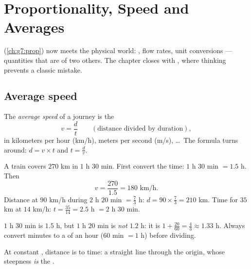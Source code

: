 \chapter{Proportionality, Speed and Averages}\label{ch:g8:speed}

 (\cref{ch:g7:prop}) now meets the physical world:
, flow rates, unit conversions --- quantities that are
\emph{} of two others. The chapter closes with , where  thinking prevents a classic mistake.

\section{Average speed}

\begin{definition}\label{def:g8:speed:def}
The \emph{average speed} of a journey is the 
\[
v = \frac{d}{t}
\qquad
\left(\text{distance divided by duration}\right),
\]
in kilometers per hour (km/h), meters per second (m/s), \dots\ The
formula turns around: $d = v \times t$ and $t = \frac{d}{v}$.
\end{definition}

\begin{example}\label{ex:g8:speed:basic}
A train covers $270$ km in $1$ h $30$ min. First convert the time:
$1$ h $30$ min $= 1.5$ h. Then
\[
v = \frac{270}{1.5} = 180 \text{ km/h}.
\]
Distance at $90$ km/h during $2$ h $20$ min $= \frac73$ h:
$d = 90 \times \frac73 = 210$ km. Time for $35$ km at $14$ km/h:
$t = \frac{35}{14} = 2.5$ h $= 2$ h $30$ min.
\end{example}

\begin{remark}
$1$ h $30$ min is $1.5$ h, but $1$ h $20$ min is \emph{not} $1.2$ h:
it is $1 + \frac{20}{60} = \frac43 \approx 1.33$ h. Always convert
minutes to a  of an hour ($60$ min $= 1$ h) before dividing.
\end{remark}

\begin{omfigure}

{\small At constant , distance is  to time: a
straight line through the origin, whose steepness \emph{is} the
.}
\end{omfigure}

